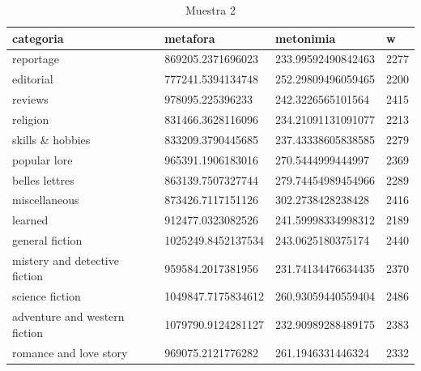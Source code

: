 \documentclass[twoside]{article}
\begin{document}
\begin{center}
    \begin{longtable}{| p{} | p{} | p{}|p{}|}
\caption{Muestra 2} 
    \hline
         categoria & metafora & metonimia & w \\ \hline
        reportage & 869205.2371696023 & 233.99592490842463 & 2277 \\ \hline
        editorial & 777241.5394134748 & 252.29809496059465 & 2200 \\ \hline
        reviews & 978095.225396233 & 242.3226565101564 & 2415 \\ \hline
        religion & 831466.3628116096 & 234.21091131091077 & 2213 \\ \hline
        skills \& hobbies & 833209.3790445685 & 237.43338605838585 & 2279 \\ \hline
        popular lore & 965391.1906183016 & 270.5444999444997 & 2369 \\ \hline
        belles lettres & 863139.7507327744 & 279.74454989454966 & 2289 \\ \hline
        miscellaneous & 873426.7117151126 & 302.2738428238428 & 2416 \\ \hline
        learned & 912477.0323082526 & 241.59998334998312 & 2189 \\ \hline
        general fiction & 1025249.8452137534 & 243.0625180375174 & 2440 \\ \hline
        mistery and detective fiction & 959584.2017381956 & 231.74134476634435 & 2370 \\ \hline
        science fiction & 1049847.7175834612 & 260.93059440559404 & 2486 \\ \hline
        adventure and western fiction & 1079790.9124281127 & 232.90989288489175 & 2383 \\ \hline
        romance and love story & 969075.2121776282 & 261.1946331446324 & 2332 \\ \hline
    \end{longtable}
    \label{muestra2}
\end{center}
\end{document}
